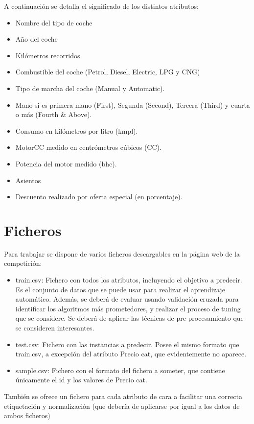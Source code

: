 \documentclass[12pt,twoside]{report}
\begin{document}
A continuación se detalla el significado de los distintos atributos:
\begin{itemize}
	\item Nombre del tipo de coche
	\item Año del coche
	\item Kilómetros recorridos
	\item Combustible del coche (Petrol, Diesel, Electric, LPG y CNG)
	\item Tipo de marcha del coche (Manual y Automatic).
	\item Mano si es primera mano (First), Segunda (Second), Tercera (Third) y cuarta o más (Fourth \& Above).
 	\item Consumo en kilómetros por litro (kmpl).
 	\item MotorCC medido en centrómetros cúbicos (CC).
 	\item Potencia del motor medido (bhc).
 	\item Asientos
 	\item Descuento realizado por oferta especial (en porcentaje).
\end{itemize} 

\section*{Ficheros}

Para trabajar se dispone de varios ficheros descargables en la página web de la competición:
\begin{itemize}
	\item train.csv: Fichero con todos los atributos, incluyendo el objetivo a predecir. Es el conjunto de datos que se puede usar para realizar el aprendizaje automático. Además, se deberá de evaluar usando validación cruzada para identificar los algoritmos más prometedores, y realizar el proceso de tuning que se considere. Se deberá de aplicar las técnicas de pre-procesamiento que se consideren interesantes.
	\item test.csv: Fichero con las instancias a predecir. Posee el mismo formato que train.csv, a excepción del atributo Precio cat, que evidentemente no aparece.
	\item sample.csv: Fichero con el formato del fichero a someter, que contiene únicamente el id y los valores de Precio cat.
\end{itemize}

También se ofrece un fichero para cada atributo de cara a facilitar una correcta etiquetación y normalización (que debería de aplicarse por igual a los datos de ambos ficheros) 
\end{document}
